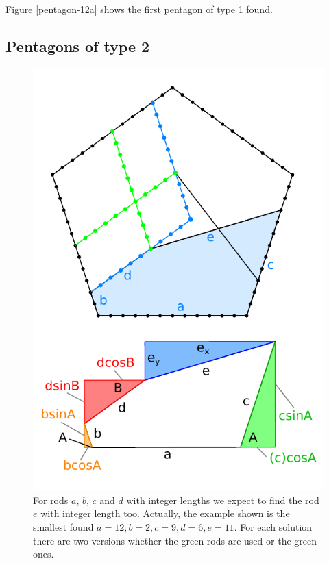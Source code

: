 \documentclass[11pt]{article}
\begin{document}
Figure \ref{pentagon-12a} shows the first pentagon of type 1 found.


\subsection{Pentagons of type 2}

\begin{figure}[htp]
\centering
\includegraphics[scale=1.00]{figs/pentagon-type-2.pdf}
\caption{For rods $a$, $b$, $c$ and $d$ with integer lengths we expect
to find the rod $e$ with integer length too. Actually, the example shown is the smallest found $a=12, b=2, c=9, d=6, e=11$. For each solution there are two versions whether the green rods are used or the green ones.}
\label{pentagon-type-2}
\end{figure}
\end{document}
